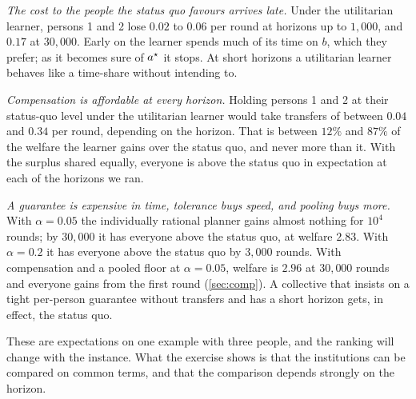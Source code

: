\emph{The cost to the people the status quo favours arrives late.} Under the utilitarian learner, persons 1 and 2 lose $0.02$ to $0.06$ per round at horizons up to $1{,}000$, and $0.17$ at $30{,}000$. Early on the learner spends much of its time on $b$, which they prefer; as it becomes sure of $a^\star$ it stops. At short horizons a utilitarian learner behaves like a time-share without intending to.

\emph{Compensation is affordable at every horizon.} Holding persons 1 and 2 at their status-quo level under the utilitarian learner would take transfers of between $0.04$ and $0.34$ per round, depending on the horizon. That is between $12\%$ and $87\%$ of the welfare the learner gains over the status quo, and never more than it. With the surplus shared equally, everyone is above the status quo in expectation at each of the horizons we ran.

\emph{A guarantee is expensive in time, tolerance buys speed, and pooling buys more.} With $\alpha=0.05$ the individually rational planner gains almost nothing for $10^4$ rounds; by $30{,}000$ it has everyone above the status quo, at welfare $2.83$. With $\alpha=0.2$ it has everyone above the status quo by $3{,}000$ rounds. With compensation and a pooled floor at $\alpha=0.05$, welfare is $2.96$ at $30{,}000$ rounds and everyone gains from the first round (\cref{sec:comp}). A collective that insists on a tight per-person guarantee without transfers and has a short horizon gets, in effect, the status quo.

These are expectations on one example with three people, and the ranking will change with the instance. What the exercise shows is that the institutions can be compared on common terms, and that the comparison depends strongly on the horizon.
